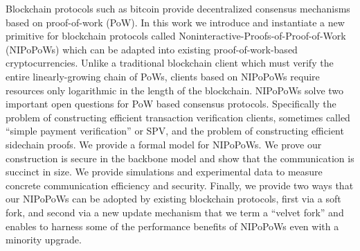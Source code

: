 Blockchain protocols such as bitcoin provide decentralized consensus mechanisms
based on proof-of-work (PoW). In this work we introduce and instantiate a new
primitive for blockchain protocols called Noninteractive-Proofs-of-Proof-of-Work
(NIPoPoWs) which can be adapted into existing proof-of-work-based
cryptocurrencies. Unlike a traditional blockchain client which must verify the
entire linearly-growing chain of PoWs, clients based on NIPoPoWs require
resources only logarithmic in the length of the blockchain. NIPoPoWs solve two
important open questions for PoW based consensus protocols. Specifically the
problem of constructing efficient transaction verification clients, sometimes
called ``simple payment verification'' or SPV, and the problem of constructing
efficient sidechain proofs. We provide a formal model for NIPoPoWs. We prove our
construction is secure in the backbone model and show that the communication is
succinct in size. We provide simulations and experimental data to measure
concrete communication efficiency and security. Finally, we provide two ways
that our NIPoPoWs can be adopted by existing blockchain protocols, first via a
soft fork, and second via a new update mechanism that we term a ``velvet fork''
and enables to harness some of the performance benefits of NIPoPoWs even with a
minority upgrade.
